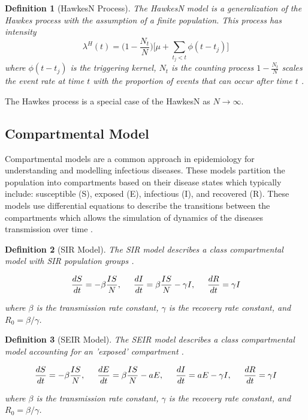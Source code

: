 \documentclass[12pt]{article}
\newtheorem{definition}{Definition}
\begin{document}
\begin{definition}[HawkesN Process] 
The HawkesN model is a generalization of the Hawkes process with the assumption of a finite population. This process has intensity
$$
\lambda^H(t) = \Big ( 1 - \frac{N_t}{N} \Big ) \Big [ \mu + \sum_{t_j < t} \phi (t - t_j) \Big ]
$$  
where $\phi( t - t_j)$ is the triggering kernel, $N_t$ is the counting process $ 1 - \frac{N_t}{N}$ scales the event rate at time $t$ with the proportion of events that can occur after time $t$ \cite{Rizoiu2018}. 
  
\end{definition}


The Hawkes process is a special case of the HawkesN as $N \to \infty$. 


\subsection{Compartmental Model}

Compartmental models are a common approach in epidemiology for understanding and modelling infectious diseases. These models partition the population into compartments based on their disease states which typically include: susceptible (S), exposed (E), infectious (I), and recovered (R). These models use differential equations to describe the transitions between the compartments which allows the simulation of dynamics of the diseases transmission over time \cite{Bertozzi2020}. 
\\

\begin{definition}[SIR Model]
The SIR model describes a class compartmental model with SIR population groups \cite{Bertozzi2020}. 

$$
\frac{dS}{dt} = - \beta \frac{IS}{N}, \hspace{5mm}
\frac{dI}{dt} = \beta \frac{IS}{N} - \gamma I, \hspace{5mm}
\frac{dR}{dt} = \gamma I 
$$

where $\beta$ is the transmission rate constant, $\gamma$ is the recovery rate constant, and $R_0 = \beta/\gamma$. 

\end{definition}
\vspace{3mm}



\begin{definition}[SEIR Model]
The SEIR model describes a class compartmental model accounting for an 'exposed' compartment \cite{Bertozzi2020}. 

$$
\frac{dS}{dt} = - \beta \frac{IS}{N}, \hspace{5mm}
\frac{dE}{dt} = \beta \frac{IS}{N} - a E, \hspace{5mm}
\frac{dI}{dt} = aE - \gamma I, \hspace{5mm}
\frac{dR}{dt} = \gamma I 
$$

where $\beta$ is the transmission rate constant, $\gamma$ is the recovery rate constant, and $R_0 = \beta/\gamma$. 

\end{definition}
\vspace{3mm}
\end{document}
